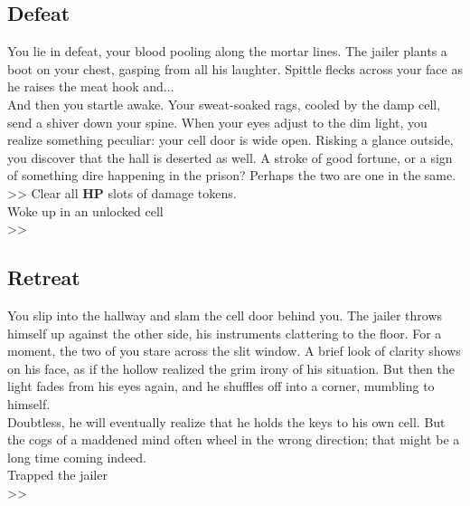 \subsection*{Defeat}
You lie in defeat, your blood pooling along the mortar lines. The jailer plants a boot on your chest, gasping from all his laughter. Spittle flecks across your face as he raises the meat hook and...\\

And then you startle awake. Your sweat-soaked rags, cooled by the damp cell, send a shiver down your spine. When your eyes adjust to the dim light, you realize something peculiar: your cell door is wide open. Risking a glance outside, you discover that the hall is deserted as well. A stroke of good fortune, or a sign of something dire happening in the prison? Perhaps the two are one in the same.\\

>> Clear all \textbf{HP} slots of damage tokens.\\
 Woke up in an unlocked cell\\
>> 

\subsection*{Retreat}
You slip into the hallway and slam the cell door behind you. The jailer throws himself up against the other side, his instruments clattering to the floor. For a moment, the two of you stare across the slit window. A brief look of clarity shows on his face, as if the hollow realized the grim irony of his situation. But then the light fades from his eyes again, and he shuffles off into a corner, mumbling to himself.\\

Doubtless, he will eventually realize that he holds the keys to his own cell. But the cogs of a maddened mind often wheel in the wrong direction; that might be a long time coming indeed.\\

 Trapped the jailer\\
>> 